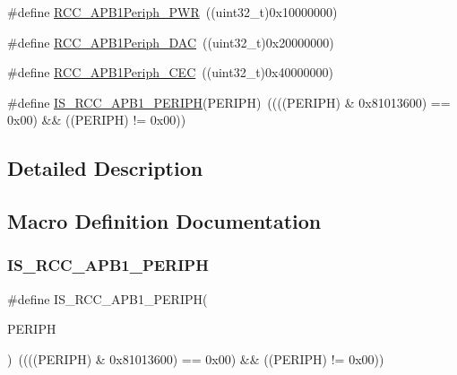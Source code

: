 \begin{DoxyCompactItemize}
\#define \mbox{\hyperlink{group___a_p_b1__peripheral_ga59ae4e17d5b35a934b1614f8ee883834}{R\+C\+C\+\_\+\+A\+P\+B1\+Periph\+\_\+\+P\+WR}}~((uint32\+\_\+t)0x10000000)
\item 
\#define \mbox{\hyperlink{group___a_p_b1__peripheral_ga8d019a727701634822c19371b6aaabb5}{R\+C\+C\+\_\+\+A\+P\+B1\+Periph\+\_\+\+D\+AC}}~((uint32\+\_\+t)0x20000000)
\item 
\#define \mbox{\hyperlink{group___a_p_b1__peripheral_gaa96437b649e13586945f40dac318a0ae}{R\+C\+C\+\_\+\+A\+P\+B1\+Periph\+\_\+\+C\+EC}}~((uint32\+\_\+t)0x40000000)
\item 
\#define \mbox{\hyperlink{group___a_p_b1__peripheral_gab68e85308494436c4c55a69c42a79f36}{I\+S\+\_\+\+R\+C\+C\+\_\+\+A\+P\+B1\+\_\+\+P\+E\+R\+I\+PH}}(P\+E\+R\+I\+PH)~((((P\+E\+R\+I\+PH) \& 0x81013600) == 0x00) \&\& ((\+P\+E\+R\+I\+P\+H) != 0x00))
\end{DoxyCompactItemize}


\subsection{Detailed Description}


\subsection{Macro Definition Documentation}
\mbox{\label{group___a_p_b1__peripheral_gab68e85308494436c4c55a69c42a79f36}} 
\subsubsection{\texorpdfstring{IS\_RCC\_APB1\_PERIPH}{IS\_RCC\_APB1\_PERIPH}}
{\footnotesize\ttfamily \#define I\+S\+\_\+\+R\+C\+C\+\_\+\+A\+P\+B1\+\_\+\+P\+E\+R\+I\+PH(\begin{DoxyParamCaption}\item[{}]{P\+E\+R\+I\+PH }\end{DoxyParamCaption})~((((P\+E\+R\+I\+PH) \& 0x81013600) == 0x00) \&\& ((\+P\+E\+R\+I\+P\+H) != 0x00))}

\mbox{\label{group___a_p_b1__peripheral_ga2a26b65d0e38030e414a9d39276645b1}} 
